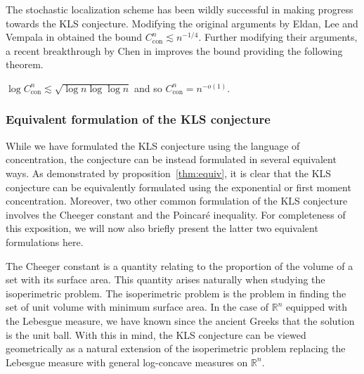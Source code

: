 
The stochastic localization scheme has been wildly successful in making progress towards the KLS conjecture. 
Modifying the original arguments by Eldan, Lee and Vempala in \cite{Lee_2016} obtained the bound 
\(C_{\text{con}}^n \lesssim n^{-1 / 4}\). Further modifying their arguments, a recent breakthrough by 
Chen in \cite{Chen_2020} improves the bound providing the following theorem. 

\begin{theorem}
  \(\log C_{\text{con}}^n \lesssim \sqrt{\log n \log \log n}\) and so \(C_{\text{con}}^n = n^{-o(1)}\).
\end{theorem}

\subsubsection{Equivalent formulation of the KLS conjecture}

While we have formulated the KLS conjecture using the language of concentration, the conjecture can be  
instead formulated in several equivalent ways. As demonstrated by proposition~\ref{thm:equiv}, it is clear 
that the KLS conjecture can be equivalently formulated using the exponential or first moment concentration. 
Moreover, two other common formulation of the KLS conjecture involves the Cheeger constant and the Poincaré 
inequality. For completeness of this exposition, we will now also briefly present the latter two equivalent 
formulations here. 

The Cheeger constant is a quantity relating to the proportion of the volume of a set with its surface area.
This quantity arises naturally when studying the isoperimetric problem. The isoperimetric problem is the problem 
in finding the set of unit volume with minimum surface area. In the case of \(\mathbb{R}^n\) equipped with the 
Lebesgue measure, we have known since the ancient Greeks that the solution is the unit ball. 
With this in mind, the KLS conjecture can be viewed geometrically as a natural extension of the isoperimetric problem 
replacing the Lebesgue measure with general log-concave measures on \(\mathbb{R}^n\).

